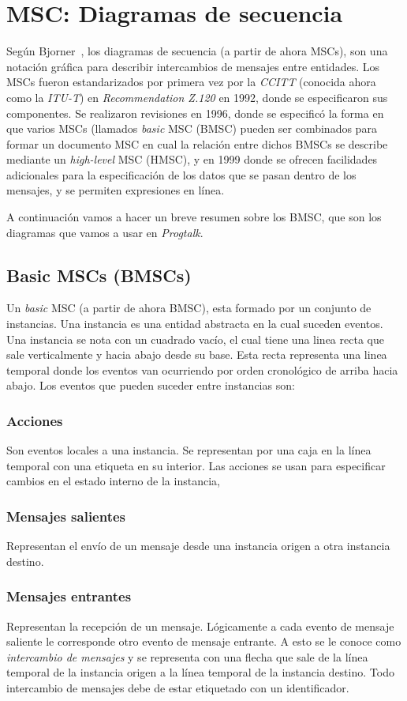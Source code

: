 \chapter{MSC: Diagramas de secuencia}
\label{ch:msc}

Según Bjorner~\cite{bjorner}, los diagramas de secuencia (a partir de
ahora MSCs), son una notación gráfica para describir intercambios de
mensajes entre entidades. Los MSCs fueron estandarizados por primera
vez por la \textit{CCITT} (conocida ahora como la \textit{ITU-T}) en
\textit{Recommendation Z.120} en 1992, donde se especificaron sus
componentes. Se realizaron revisiones en 1996, donde se especificó la
forma en que varios MSCs (llamados \textit{basic} MSC (BMSC) pueden
ser combinados para formar un documento MSC en cual la relación entre
dichos BMSCs se describe mediante un \textit{high-level} MSC (HMSC), y
en 1999 donde se ofrecen facilidades adicionales para la
especificación de los datos que se pasan dentro de los mensajes, y se
permiten expresiones en línea.

A continuación vamos a hacer un breve resumen sobre los BMSC, que son
los diagramas que vamos a usar en \textit{Progtalk}.

\section{Basic MSCs (BMSCs)}
Un \textit{basic} MSC (a partir de ahora BMSC), esta formado por un
conjunto de instancias. Una instancia es una entidad abstracta en la
cual suceden eventos. Una instancia se nota con un cuadrado vacío, el
cual tiene una linea recta que sale verticalmente y hacia abajo desde
su base. Esta recta representa una linea temporal donde los eventos
van ocurriendo por orden cronológico de arriba hacia abajo. Los
eventos que pueden suceder entre instancias son:

\subsection*{Acciones}
Son eventos locales a una instancia. Se representan por una caja en la
línea temporal con una etiqueta en su interior. Las acciones se usan
para especificar cambios en el estado interno de la instancia,
\subsection*{Mensajes salientes} 
Representan el envío de un mensaje desde una instancia origen a otra
instancia destino.
\subsection*{Mensajes entrantes}
Representan la recepción de un mensaje. Lógicamente a cada evento de
mensaje saliente le corresponde otro evento de mensaje entrante. A
esto se le conoce como \textit{intercambio de mensajes} y se representa con una
flecha que sale de la línea temporal de la instancia origen a la
línea temporal de la instancia destino. Todo intercambio de mensajes
debe de estar etiquetado con un identificador.


